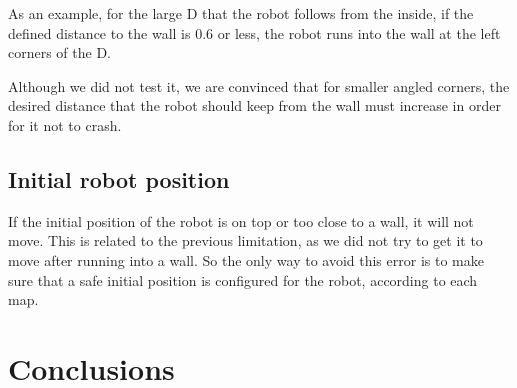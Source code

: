 \documentclass[12pt,a4paper,reqno]{article}
\numberwithin{figure}{section}
\numberwithin{equation}{section}
\begin{document}
As an example, for the large D that the robot follows from the inside, if the defined distance to the wall is 0.6 or less, the robot runs into the wall at the left corners of the D.

Although we did not test it, we are convinced that for smaller angled corners, the desired distance that the robot should keep from the wall must increase in order for it not to crash.

\subsection{Initial robot position}

If the initial position of the robot is on top or too close to a wall, it will not move. This is related to the previous limitation, as we did not try to get it to move after running into a wall. So the only way to avoid this error is to make sure that a safe initial position is configured for the robot, according to each map.

\section{Conclusions}



\end{document}
